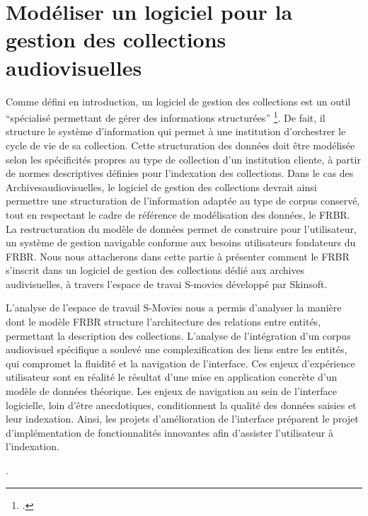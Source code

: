 \chapter{\label{I_2}Modéliser un logiciel pour la gestion des collections audiovisuelles} 



Comme défini en introduction, un logiciel de gestion des collections est un outil “spécialisé permettant de gérer des informations structurées” \footcite{zotero-item-766}. De fait, il structure le système d’information qui permet à une institution d’orchestrer le cycle de vie de sa collection. Cette structuration des données doit être modélisée selon les spécificités propres au type de collection d’un institution cliente, à partir de normes descriptives définies pour l’indexation des collections. Dans le cas des \gls{Archivesaudiovisuelles}, le logiciel de gestion des collections devrait ainsi permettre une structuration de l’information adaptée au type de corpus conservé, tout en respectant le cadre de référence de modélisation des données, le \gls{FRBR}. La restructuration du modèle de données permet de construire pour l’utilisateur, un système de gestion navigable conforme aux besoins utilisateurs fondateurs du \gls{FRBR}. Nous nous attacherons dans cette partie à présenter comment le FRBR s'inscrit dans un logiciel de gestion des collections dédié aux archives audivisuelles, à travers l'espace de travai S-movies développé par Skinsoft.







L’analyse de l’espace de travail S-Movies nous a permis d’analyser la manière dont le modèle \gls{FRBR} structure l’architecture des relations entre entités, permettant la description des collections. L'analyse de l'intégration d'un corpus audiovisuel spécifique a soulevé une complexification des liens entre les entités, qui compromet la fluidité et la navigation de l'interface. Ces enjeux d'expérience utilisateur sont en réalité le résultat d'une mise en application concrète d'un modèle de données théorique. Les enjeux de navigation au sein de l'interface logicielle, loin d'être anecdotiques, conditionnent la qualité des données saisies et leur indexation. Ainsi, les projets d'amélioration de l'interface préparent le projet d'implémentation de fonctionnalités innovantes afin d'assister l'utilisateur à l'indexation. 



















. 
